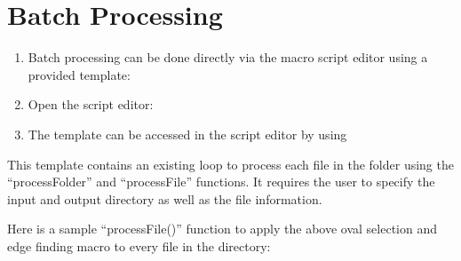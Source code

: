 \documentclass[letterpaper,10pt,english]{jupyterBook}
\begin{document}
\section{Batch Processing}
\label{\detokenize{basic-scripting:batch-processing}}\begin{enumerate}
%
\item {} 
\sphinxAtStartPar
Batch processing can be done directly via the macro script editor using a provided template:

\item {} 
\sphinxAtStartPar
Open the script editor: 

\item {} 
\sphinxAtStartPar
The template can be accessed in the script editor by using  

\end{enumerate}

\sphinxAtStartPar
This template contains an existing loop to process each file in the folder
using the “processFolder” and “processFile” functions. It requires the user
to specify the input and output directory as well as the file information.

\sphinxAtStartPar
{}

\sphinxAtStartPar
Here is a sample “processFile()” function to apply the above oval selection and edge finding macro to every file in the directory:
\end{document}
